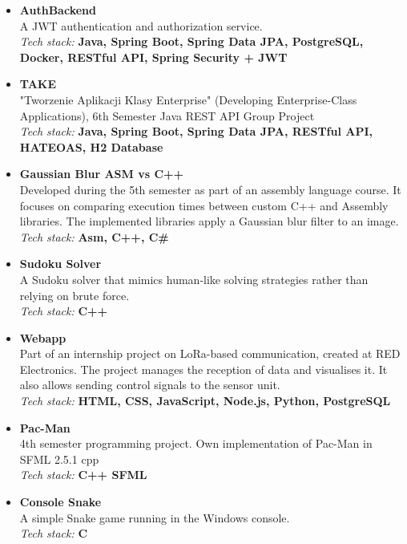 \documentclass[11pt,letterpaper]{article}
\begin{document}
\begin{itemize}[leftmargin=0.5cm]
  \setlength\itemsep{0.4em}
      \item \textbf{AuthBackend} \\
      A JWT authentication and authorization service.\\ [.4em]
      \textit{Tech stack:} \textbf{Java, Spring Boot, Spring Data JPA, PostgreSQL,  Docker, RESTful API, Spring Security + JWT}

      \item \textbf{TAKE} \\
      "Tworzenie Aplikacji Klasy Enterprise" (Developing Enterprise-Class Applications), 6th Semester Java REST API Group Project\\ [.4em]
      \textit{Tech stack:} \textbf{Java, Spring Boot, Spring Data JPA, RESTful API, HATEOAS, H2 Database  }
      
      \item \textbf{Gaussian Blur ASM vs C++} \\
      Developed during the 5th semester as part of an assembly language course.
      It focuses on comparing execution times between custom C++ and Assembly libraries.
      The implemented libraries apply a Gaussian blur filter to an image.\\ [.3em]
      \textit{Tech stack:} \textbf{Asm, C++, C\#}

      \item \textbf{Sudoku Solver} \\
      A Sudoku solver that mimics human-like solving strategies rather than relying on brute force. \\ [.3em]
      \textit{Tech stack:} \textbf{C++}
      
      \item \textbf{Webapp} \\
      Part of an internship project on LoRa-based communication, created at RED Electronics. 
      The project manages the reception of data and visualises it. It also allows sending control signals to the sensor unit. \\ [.3em]
      \textit{Tech stack:} \textbf{HTML, CSS, JavaScript, Node.js, Python, PostgreSQL}

      \item \textbf{Pac-Man} \\
      4th semester programming project. Own implementation of Pac-Man in SFML 2.5.1 cpp \\ [.3em]
      \textit{Tech stack:} \textbf{C++ SFML}

      \item \textbf{Console Snake} \\
      A simple Snake game running in the Windows console.  \\ [.3em]
      \textit{Tech stack:} \textbf{C}
\end{itemize}
\end{document}

